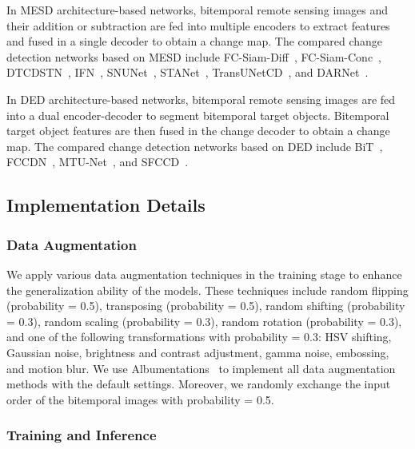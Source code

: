 \documentclass[journal]{IEEEtran}
\begin{document}
In MESD architecture-based networks, bitemporal remote sensing images and their addition or subtraction are fed into multiple encoders to extract features and fused in a single decoder to obtain a change map. The compared change detection networks based on MESD include FC-Siam-Diff~\cite{fcef}, FC-Siam-Conc~\cite{fcef}, DTCDSTN~\cite{dtcdstn}, IFN~\cite{dsifn}, SNUNet~\cite{snu}, STANet~\cite{sta}, TransUNetCD~\cite{transunetcd}, and DARNet~\cite{darn}.

In DED architecture-based networks, bitemporal remote sensing images are fed into a dual encoder-decoder to segment bitemporal target objects. Bitemporal target object features are then fused in the change decoder to obtain a change map. The compared change detection networks based on DED include BiT~\cite{bit}, FCCDN~\cite{fccdn}, MTU-Net~\cite{mtu}, and SFCCD~\cite{njds}.

\subsection{Implementation Details}

\subsubsection{Data Augmentation}

We apply various data augmentation techniques in the training stage to enhance the generalization ability of the models. These techniques include random flipping (probability = 0.5), transposing (probability = 0.5), random shifting (probability = 0.3), random scaling (probability = 0.3), random rotation (probability = 0.3), and one of the following transformations with probability = 0.3: HSV shifting, Gaussian noise, brightness and contrast adjustment, gamma noise, embossing, and motion blur. We use Albumentations~\cite{albu} to implement all data augmentation methods with the default settings. Moreover, we randomly exchange the input order of the bitemporal images with probability = 0.5.

\subsubsection{Training and Inference}
\label{section:4.3.2}
\end{document}
